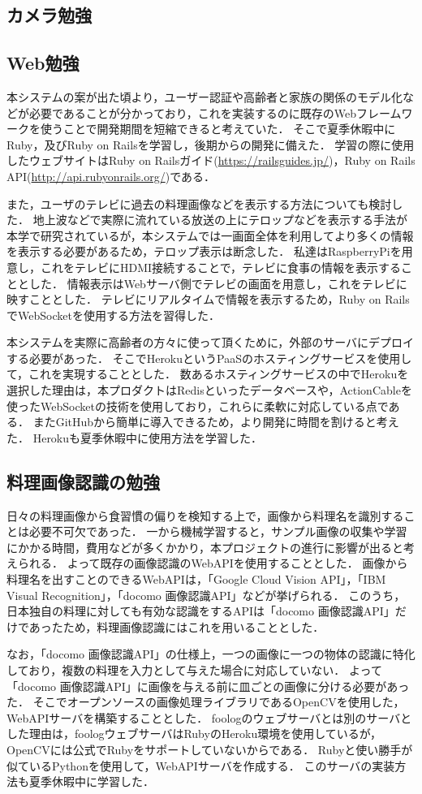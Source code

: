 \documentclass[../report]{subfiles}
\begin{document}
\subsection{カメラ勉強}


\subsection{Web勉強}
本システムの案が出た頃より，ユーザー認証や高齢者と家族の関係のモデル化などが必要であることが分かっており，これを実装するのに既存のWebフレームワークを使うことで開発期間を短縮できると考えていた．
そこで夏季休暇中にRuby，及びRuby on Railsを学習し，後期からの開発に備えた．
学習の際に使用したウェブサイトはRuby on Railsガイド(\url{https://railsguides.jp/})，Ruby on Rails API(\url{http://api.rubyonrails.org/})である．

また，ユーザのテレビに過去の料理画像などを表示する方法についても検討した．
地上波などで実際に流れている放送の上にテロップなどを表示する手法が本学で研究されているが，本システムでは一画面全体を利用してより多くの情報を表示する必要があるため，テロップ表示は断念した．
私達はRaspberryPiを用意し，これをテレビにHDMI接続することで，テレビに食事の情報を表示することとした．
情報表示はWebサーバ側でテレビの画面を用意し，これをテレビに映すこととした．
テレビにリアルタイムで情報を表示するため，Ruby on RailsでWebSocketを使用する方法を習得した．

本システムを実際に高齢者の方々に使って頂くために，外部のサーバにデプロイする必要があった．
そこでHerokuというPaaSのホスティングサービスを使用して，これを実現することとした．
数あるホスティングサービスの中でHerokuを選択した理由は，本プロダクトはRedisといったデータベースや，ActionCableを使ったWebSocketの技術を使用しており，これらに柔軟に対応している点である．
またGitHubから簡単に導入できるため，より開発に時間を割けると考えた．
Herokuも夏季休暇中に使用方法を学習した．


\subsection{料理画像認識の勉強}
日々の料理画像から食習慣の偏りを検知する上で，画像から料理名を識別することは必要不可欠であった．
一から機械学習すると，サンプル画像の収集や学習にかかる時間，費用などが多くかかり，本プロジェクトの進行に影響が出ると考えられる．
よって既存の画像認識のWebAPIを使用することとした．
画像から料理名を出すことのできるWebAPIは，「Google Cloud Vision API」，「IBM Visual Recognition」，「docomo 画像認識API」などが挙げられる．
このうち，日本独自の料理に対しても有効な認識をするAPIは「docomo 画像認識API」だけであったため，料理画像認識にはこれを用いることとした．

なお，「docomo 画像認識API」の仕様上，一つの画像に一つの物体の認識に特化しており，複数の料理を入力として与えた場合に対応していない．
よって「docomo 画像認識API」に画像を与える前に皿ごとの画像に分ける必要があった．
そこでオープンソースの画像処理ライブラリであるOpenCVを使用した，WebAPIサーバを構築することとした．
foologのウェブサーバとは別のサーバとした理由は，foologウェブサーバはRubyのHeroku環境を使用しているが，OpenCVには公式でRubyをサポートしていないからである．
Rubyと使い勝手が似ているPythonを使用して，WebAPIサーバを作成する．
このサーバの実装方法も夏季休暇中に学習した．
\end{document}
